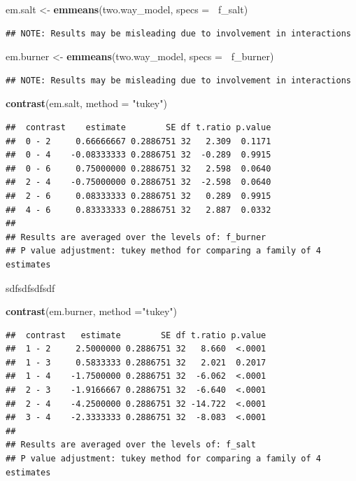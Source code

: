 \documentclass[12pt,]{article}
\newenvironment{Shaded}{\begin{snugshade}}{\end{snugshade}}
\newcommand{\KeywordTok}[1]{\textcolor[rgb]{0.13,0.29,0.53}{\textbf{#1}}}
\newcommand{\DataTypeTok}[1]{\textcolor[rgb]{0.13,0.29,0.53}{#1}}
\newcommand{\StringTok}[1]{\textcolor[rgb]{0.31,0.60,0.02}{#1}}
\newcommand{\OperatorTok}[1]{\textcolor[rgb]{0.81,0.36,0.00}{\textbf{#1}}}
\newcommand{\NormalTok}[1]{#1}
\begin{document}
\begin{Shaded}
\begin{Highlighting}[]
\NormalTok{em.salt <-}\StringTok{ }\KeywordTok{emmeans}\NormalTok{(two.way_model, }\DataTypeTok{specs =} \OperatorTok{~}\NormalTok{f_salt)}
\end{Highlighting}
\end{Shaded}

\begin{verbatim}
## NOTE: Results may be misleading due to involvement in interactions
\end{verbatim}

\begin{Shaded}
\begin{Highlighting}[]
\NormalTok{em.burner <-}\StringTok{ }\KeywordTok{emmeans}\NormalTok{(two.way_model, }\DataTypeTok{specs =} \OperatorTok{~}\NormalTok{f_burner)}
\end{Highlighting}
\end{Shaded}

\begin{verbatim}
## NOTE: Results may be misleading due to involvement in interactions
\end{verbatim}

\begin{Shaded}
\begin{Highlighting}[]
\KeywordTok{contrast}\NormalTok{(em.salt, }\DataTypeTok{method =} \StringTok{"tukey"}\NormalTok{)}
\end{Highlighting}
\end{Shaded}

\begin{verbatim}
##  contrast    estimate        SE df t.ratio p.value
##  0 - 2     0.66666667 0.2886751 32   2.309  0.1171
##  0 - 4    -0.08333333 0.2886751 32  -0.289  0.9915
##  0 - 6     0.75000000 0.2886751 32   2.598  0.0640
##  2 - 4    -0.75000000 0.2886751 32  -2.598  0.0640
##  2 - 6     0.08333333 0.2886751 32   0.289  0.9915
##  4 - 6     0.83333333 0.2886751 32   2.887  0.0332
## 
## Results are averaged over the levels of: f_burner 
## P value adjustment: tukey method for comparing a family of 4 estimates
\end{verbatim}

sdfsdfsdfsdf

\begin{Shaded}
\begin{Highlighting}[]
\KeywordTok{contrast}\NormalTok{(em.burner, }\DataTypeTok{method =}\StringTok{"tukey"}\NormalTok{)}
\end{Highlighting}
\end{Shaded}

\begin{verbatim}
##  contrast   estimate        SE df t.ratio p.value
##  1 - 2     2.5000000 0.2886751 32   8.660  <.0001
##  1 - 3     0.5833333 0.2886751 32   2.021  0.2017
##  1 - 4    -1.7500000 0.2886751 32  -6.062  <.0001
##  2 - 3    -1.9166667 0.2886751 32  -6.640  <.0001
##  2 - 4    -4.2500000 0.2886751 32 -14.722  <.0001
##  3 - 4    -2.3333333 0.2886751 32  -8.083  <.0001
## 
## Results are averaged over the levels of: f_salt 
## P value adjustment: tukey method for comparing a family of 4 estimates
\end{verbatim}
\end{document}
